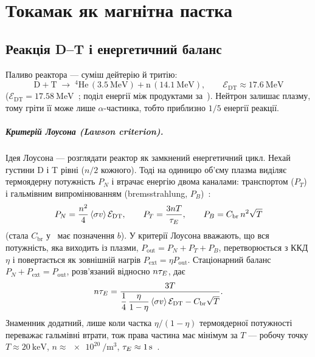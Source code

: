 \chapter{Токамак як магнітна пастка}\label{ch:trap}

\section{Реакція D--T і енергетичний баланс}\label{sec:01-dt}

Паливо реактора --- суміш дейтерію й тритію:
\begin{equation}\label{eq:01-dt}
  \mathrm{D}+\mathrm{T}\;\to\;{}^{4}\mathrm{He}\,(\SI{3.5}{\mega\electronvolt})
  +\mathrm{n}\,(\SI{14.1}{\mega\electronvolt}),\qquad
  \mathcal{E}_{\mathrm{DT}}\approx\SI{17.6}{\mega\electronvolt}
\end{equation}
($\mathcal{E}_{\mathrm{DT}}=\SI{17.58}{\mega\electronvolt}$~\cite{Merlo2011}; поділ енергії
між продуктами за~\cite{Marchuk2025}). Нейтрон залишає плазму, тому гріти її може лише
$\alpha$-частинка, тобто приблизно $1/5$ енергії реакції.

\paragraph{Критерій Лоусона (Lawson criterion).} Ідея Лоусона --- розглядати реактор
як замкнений енергетичний цикл. Нехай густини D і T рівні ($n/2$ кожного). Тоді на одиницю
об'єму плазма виділяє термоядерну потужність $P_N$ і втрачає енергію двома каналами:
транспортом ($P_T$) і гальмівним випромінюванням (bremsstrahlung, $P_B$)~\cite{Merlo2011}:
\begin{equation}\label{eq:01-powers}
  P_{N}=\frac{n^{2}}{4}\left\langle \sigma v \right\rangle\mathcal{E}_{\mathrm{DT}},\qquad
  P_{T}=\frac{3nT}{\tau_{E}},\qquad P_{B}=C_{\mathrm{br}}\,n^{2}\sqrt{T}
\end{equation}
(стала $C_{\mathrm{br}}$ у~\cite{Merlo2011} має позначення $b$). У критерії Лоусона вважають,
що вся потужність, яка виходить із плазми, $P_{\mathrm{out}}=P_N+P_T+P_B$, перетворюється з
ККД $\eta$ і повертається як зовнішній нагрів $P_{\mathrm{ext}}=\eta P_{\mathrm{out}}$.
Стаціонарний баланс $P_N+P_{\mathrm{ext}}=P_{\mathrm{out}}$, розв'язаний відносно $n\tau_{E}$,
дає~\cite{Merlo2011}
\begin{equation}\label{eq:01-lawson}
  n\tau_{E}=\frac{3T}{\dfrac14\,\dfrac{\eta}{1-\eta}\left\langle \sigma v \right\rangle\mathcal{E}_{\mathrm{DT}}-C_{\mathrm{br}}\sqrt{T}}.
\end{equation}
Знаменник додатний, лише коли частка $\eta/(1-\eta)$ термоядерної потужності переважає гальмівні втрати, тож права
частина має мінімум за $T$ --- робочу точку $T\approx\SI{20}{\kilo\electronvolt}$,
$n\approx\SI{e20}{\per\cubic\metre}$, $\tau_{E}\approx\SI{1}{\second}$~\cite{Merlo2011}.

